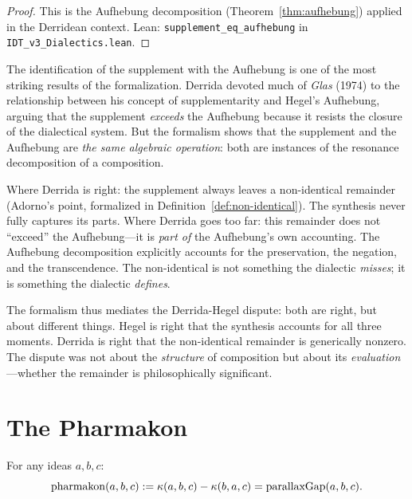 \begin{proof}
This is the Aufhebung decomposition (Theorem~\ref{thm:aufhebung}) applied
in the Derridean context.
Lean: \texttt{supplement\_eq\_aufhebung} in \texttt{IDT\_v3\_Dialectics.lean}.
\end{proof}

\begin{interpretation}
\label{interp:supplement-aufhebung}
The identification of the supplement with the Aufhebung is one of the most
striking results of the formalization. Derrida devoted much of \textit{Glas}
(1974) to the relationship between his concept of supplementarity and Hegel's
Aufhebung, arguing that the supplement \emph{exceeds} the Aufhebung because
it resists the closure of the dialectical system. But the formalism shows that
the supplement and the Aufhebung are \emph{the same algebraic operation}:
both are instances of the resonance decomposition of a composition.

Where Derrida is right: the supplement always leaves a non-identical remainder
(Adorno's point, formalized in Definition~\ref{def:non-identical}). The
synthesis never fully captures its parts. Where Derrida goes too far: this
remainder does not ``exceed'' the Aufhebung---it is \emph{part of} the
Aufhebung's own accounting. The Aufhebung decomposition explicitly accounts
for the preservation, the negation, and the transcendence. The non-identical
is not something the dialectic \emph{misses}; it is something the dialectic
\emph{defines}.

The formalism thus mediates the Derrida-Hegel dispute: both are right, but
about different things. Hegel is right that the synthesis accounts for all
three moments. Derrida is right that the non-identical remainder is
generically nonzero. The dispute was not about the \emph{structure} of
composition but about its \emph{evaluation}---whether the remainder is
philosophically significant.
\end{interpretation}

\section{The Pharmakon}

\begin{theorem}
\label{thm:pharmakon}
For any ideas $a, b, c$:
\[
\mathrm{pharmakon}(a, b, c) := \kappa(a, b, c) - \kappa(b, a, c)
= \mathrm{parallaxGap}(a, b, c).
\]
\end{theorem}

